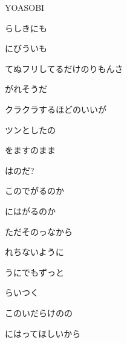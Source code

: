 \documentclass[a4paper,tate,twocolumn,12pt]{ltjtarticle}
\begin{document}
\thispagestyle{empty}

\begin{center}
{\LARGE {}}

{\large YOASOBI}
\end{center}

\vspace{1em}

\begin{flushleft}

\noindent\begin{minipage}{\linewidth}
らしきにも

にびういも

てぬフリしてるだけのりもんさ

がれそうだ

クラクラするほどのいいが

ツンとしたの

をますのまま

はのだ?
\end{minipage}

\vspace{2em}

\noindent\begin{minipage}{\linewidth}
このでがるのか

にはがるのか

ただそのっなから

れちないように
\end{minipage}

\vspace{2em}

\noindent\begin{minipage}{\linewidth}
うにでもずっと

らいつく

このいだらけのの

にはってほしいから


\end{minipage}
\end{flushleft}
\end{document}
